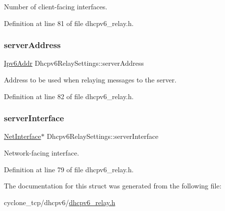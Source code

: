 Number of client-\/facing interfaces. 



Definition at line 81 of file dhcpv6\+\_\+relay.\+h.

\mbox{\label{structDhcpv6RelaySettings_a67c3bcbd5fc280fe4bbff6e074ae4d8b}} 
\subsubsection{\texorpdfstring{server\+Address}{serverAddress}}
{\footnotesize\ttfamily \hyperlink{ipv6_8h_aed0cbc40c61ed5b4fb681ebc55237e89}{Ipv6\+Addr} Dhcpv6\+Relay\+Settings\+::server\+Address}



Address to be used when relaying messages to the server. 



Definition at line 82 of file dhcpv6\+\_\+relay.\+h.

\mbox{\label{structDhcpv6RelaySettings_afa82c181218d1b3adefa0df21eba2f4e}} 
\subsubsection{\texorpdfstring{server\+Interface}{serverInterface}}
{\footnotesize\ttfamily \hyperlink{net_8h_a2234db8911a1148c9159979d8f5e0d6b}{Net\+Interface}$\ast$ Dhcpv6\+Relay\+Settings\+::server\+Interface}



Network-\/facing interface. 



Definition at line 79 of file dhcpv6\+\_\+relay.\+h.



The documentation for this struct was generated from the following file\+:\begin{DoxyCompactItemize}
\item 
cyclone\+\_\+tcp/dhcpv6/\hyperlink{dhcpv6__relay_8h}{dhcpv6\+\_\+relay.\+h}\end{DoxyCompactItemize}
